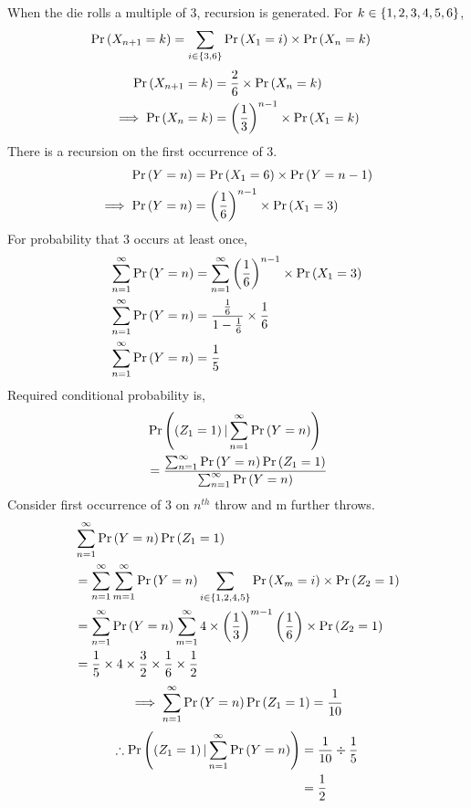 \documentclass[journal,12pt,twocolumn]{IEEEtran}
\begin{document}
When the die rolls a multiple of 3, recursion is generated. For $k \in \left\{1,2,3,4,5,6\right\}$,
\begin{align}
    \Pr\left(X_{n+1}=k\right) &= \sum_{i \in \left\{3, 6\right\}}\Pr\left(X_1=i\right) \times \Pr\left(X_n=k\right)
    \label{eq:recursionX}
\end{align}
\begin{align}
    \Pr\left(X_{n+1}=k\right) &= \frac{2}{6} \times \Pr\left(X_n=k\right)\\
    \implies \Pr\left(X_{n}=k\right) &= \left(\frac{1}{3}\right)^{n-1} \times \Pr\left(X_1=k\right)
\end{align}
There is a recursion on the first occurrence of 3.
\begin{align}
    \Pr\left(Y=n\right) &= \Pr\left(X_1=6\right) \times \Pr\left(Y= n-1\right) \\
    \implies \Pr\left(Y=n\right) &= \left(\frac{1}{6}\right)^{n-1} \times \Pr\left(X_1=3\right) 
    \label{eq:recursionY}
\end{align}
For probability that 3 occurs at least once,
\begin{align}
    \sum_{n=1}^\infty  \Pr\left(Y=n\right) &= 
     \sum_{n=1}^\infty \left(\frac{1}{6}\right)^{n-1} \times \Pr\left(X_1=3\right) \\
    \sum_{n=1}^\infty \Pr\left(Y=n\right) &= 
     \frac{\frac{1}{6}}{1-\frac{1}{6}} \times \frac{1}{6} \\
   \sum_{n=1}^\infty \Pr\left(Y=n\right) &= \frac{1}{5}
   \label{eq:occurrence3}
\end{align}
Required conditional probability is,
\begin{align}
    &\Pr\left(\left(Z_1=1\right) | \sum_{n=1}^\infty \Pr\left(Y=n\right)\right) \\
    &=\frac{ \sum_{n=1}^\infty \Pr\left(Y=n\right) \Pr\left(Z_1 = 1\right)} {\sum_{n=1}^\infty \Pr\left(Y=n\right)}
\end{align}
Consider first occurrence of 3 on $n^{th}$ throw and m further throws.
\begin{align}
    &\sum_{n=1}^\infty \Pr\left(Y=n\right) \Pr\left(Z_1 = 1\right) \\
    &=\sum_{n=1}^\infty \sum_{m=1}^\infty \Pr\left(Y=n\right) 
      \sum_{i \in \left\{1,2,4,5\right\}}\Pr\left(X_m = i\right) \times \Pr\left(Z_2 = 1\right) \\
    &=\sum_{n=1}^\infty \Pr\left(Y=n\right) \sum_{m=1}^\infty 
    4 \times \left(\frac{1}{3}\right)^{m-1} \left(\frac{1}{6}\right) \times \Pr\left(Z_2 = 1\right) \\
    &= \frac{1}{5} \times 4 \times \frac{3}{2} \times \frac{1}{6} \times \frac{1}{2}
\end{align}
\begin{align}
    \implies \sum_{n=1}^\infty \Pr\left(Y=n\right) \Pr\left(Z_1 = 1\right) = \frac{1}{10}
\end{align}
\begin{align}
    \therefore \Pr\left(\left(Z_1=1\right) | \sum_{n=1}^\infty \Pr\left(Y=n\right)\right)  &= \frac{1}{10} \div \frac{1}{5} \\
    &= \frac{1}{2}
\end{align}
\end{document}
